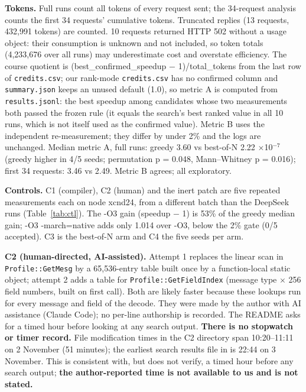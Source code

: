 \documentclass[10pt,a4paper]{article}
\begin{document}
\textbf{Tokens.} Full runs count all tokens of every request sent; the 34-request analysis counts the first 34 requests' cumulative tokens. Truncated replies (13 requests, 432,991 tokens) are counted. 10 requests returned HTTP 502 without a usage object: their consumption is unknown and not included, so token totals (4,233,676 over all runs) may underestimate cost and overstate efficiency. The course quotient is (best\_confirmed\_speedup $-$ 1)/total\_tokens from the last row of \texttt{credits.csv}; our rank-mode \texttt{credits.csv} has no confirmed column and \texttt{summary.json} keeps an unused default (1.0), so metric A is computed from \texttt{results.jsonl}: the best speedup among candidates whose two measurements both passed the frozen rule (it equals the search's best ranked value in all 10 runs, which is not itself used as the confirmed value). Metric B uses the independent re-measurement; they differ by under 2\% and the logs are unchanged. Median metric A, full runs: greedy 3.60 vs best-of-N 2.22 $\times$10$^{-7}$ (greedy higher in 4/5 seeds; permutation p = 0.048, Mann--Whitney p = 0.016); first 34 requests: 3.46 vs 2.49. Metric B agrees; all exploratory.

\textbf{Controls.} C1 (compiler), C2 (human) and the inert patch are five repeated measurements each on node xcnd24, from a different batch than the DeepSeek runs (Table~\ref{tab:ctl}). The -O3 gain (speedup $-$ 1) is 53\% of the greedy median gain; -O3 -march=native adds only 1.014 over -O3, below the 2\% gate (0/5 accepted). C3 is the best-of-N arm and C4 the five seeds per arm.

\textbf{C2 (human-directed, AI-assisted).} Attempt 1 replaces the linear scan in \texttt{Profile::GetMesg} by a 65,536-entry table built once by a function-local static object; attempt 2 adds a table for \texttt{Profile::GetFieldIndex} (message type $\times$ 256 field numbers, built on first call). Both are likely faster because these lookups run for every message and field of the decode. They were made by the author with AI assistance (Claude Code); no per-line authorship is recorded. The README asks for a timed hour before looking at any search output. \textbf{There is no stopwatch or timer record.} File modification times in the C2 directory span 10:20--11:11 on 2 November (51 minutes); the earliest search results file in  is 22:44 on 3 November. This is consistent with, but does not verify, a timed hour before any search output; \textbf{the author-reported time is not available to us and is not stated.}
\end{document}
